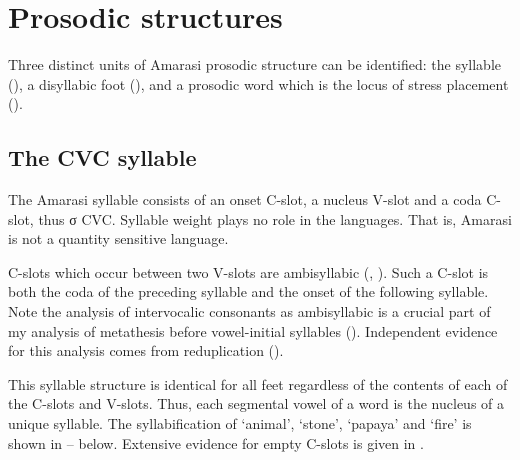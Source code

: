 \section{Prosodic structures}\label{sec:ProsStr}
Three distinct units of Amarasi prosodic structure
can be identified: the syllable (),
a disyllabic foot (),
and a prosodic word which is the locus of stress placement ().

\subsection{The CVC syllable}\label{sec:Syl}
The Amarasi syllable consists of an onset C-slot, a nucleus V-slot
and a coda C-slot, thus σ {\ra} CVC.
Syllable weight plays no role in the languages.
That is, Amarasi is not a quantity sensitive language.

C-slots which occur between two V-slots are ambisyllabic
(\citealp[36]{clke83}, \citealp[217ff]{du90}).
Such a C-slot is both the coda of the preceding syllable
and the onset of the following syllable.
Note the analysis of intervocalic consonants as
ambisyllabic is a crucial part of my analysis of
metathesis before vowel-initial syllables ().
Independent evidence for this analysis comes from reduplication ().

This syllable structure is identical for all feet regardless
of the contents of each of the C-slots and V-slots.
Thus, each segmental vowel of a word is the nucleus of a unique syllable.
The syllabification of  `animal',  `stone',  `papaya' and  `fire'
is shown in -- below.
Extensive evidence for empty C-slots is given in .

